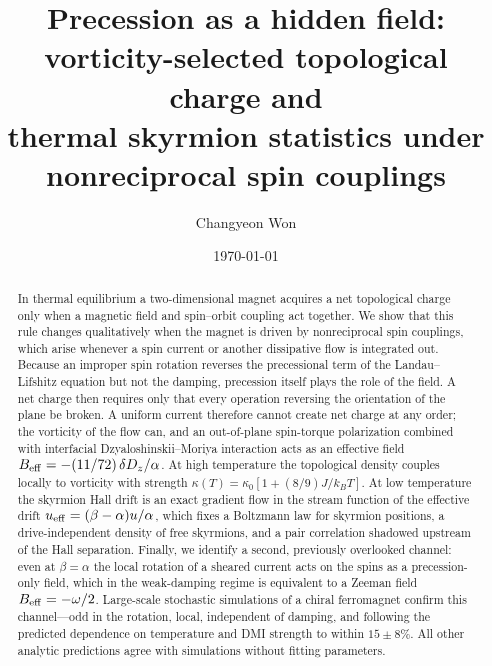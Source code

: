 \documentclass[aps,prb,twocolumn,superscriptaddress,longbibliography,floatfix]{revtex4-2}
\newcommand{\ueff}{u_{\rm eff}}
\newcommand{\kT}{k_BT}
\newcommand{\Beff}{B_{\rm eff}}
\begin{document}
\title{Precession as a hidden field: vorticity-selected topological charge and\\ thermal skyrmion statistics under nonreciprocal spin couplings}

\author{Changyeon Won}

\date{\today}

\begin{abstract}
In thermal equilibrium a two-dimensional magnet acquires a net topological charge only when a magnetic field and spin--orbit coupling act together. We show that this rule changes qualitatively when the magnet is driven by nonreciprocal spin couplings, which arise whenever a spin current or another dissipative flow is integrated out. Because an improper spin rotation reverses the precessional term of the Landau--Lifshitz equation but not the damping, precession itself plays the role of the field. A net charge then requires only that every operation reversing the orientation of the plane be broken. A uniform current therefore cannot create net charge at any order; the vorticity of the flow can, and an out-of-plane spin-torque polarization combined with interfacial Dzyaloshinskii--Moriya interaction acts as an effective field $\Beff=-(11/72)\,\delta D_z/\alpha$. At high temperature the topological density couples locally to vorticity with strength $\kappa(T)=\kappa_0[1+(8/9)J/\kT]$. At low temperature the skyrmion Hall drift is an exact gradient flow in the stream function of the effective drift $\ueff=(\beta-\alpha)u/\alpha$, which fixes a Boltzmann law for skyrmion positions, a drive-independent density of free skyrmions, and a pair correlation shadowed upstream of the Hall separation. Finally, we identify a second, previously overlooked channel: even at $\beta=\alpha$ the local rotation of a sheared current acts on the spins as a precession-only field, which in the weak-damping regime is equivalent to a Zeeman field $\Beff=-\omega/2$. Large-scale stochastic simulations of a chiral ferromagnet confirm this channel---odd in the rotation, local, independent of damping, and following the predicted dependence on temperature and DMI strength to within $15\pm8\%$. All other analytic predictions agree with simulations without fitting parameters.
\end{abstract}

\maketitle
\end{document}
